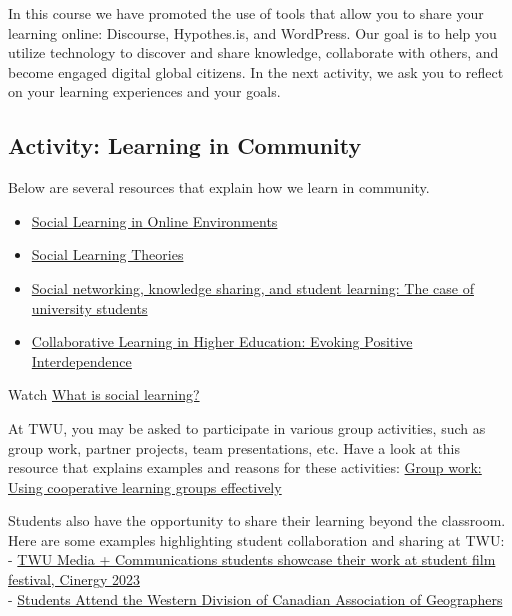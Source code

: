 \documentclass[
]{book}
\providecommand{\tightlist}{%
  \setlength{\itemsep}{0pt}\setlength{\parskip}{0pt}}
\theoremstyle{definition}
\theoremstyle{definition}
\theoremstyle{definition}
\theoremstyle{definition}
\theoremstyle{remark}
\begin{document}
In this course we have promoted the use of tools that allow you to share your learning online: Discourse, Hypothes.is, and WordPress. Our goal is to help you utilize technology to discover and share knowledge, collaborate with others, and become engaged digital global citizens. In the next activity, we ask you to reflect on your learning experiences and your goals.

\hypertarget{activity-learning-in-community}{%
\subsection*{Activity: Learning in Community}\label{activity-learning-in-community}}

\begin{reflect}
Below are several resources that explain how we learn in community.

\begin{itemize}
\tightlist
\item
  \href{https://openpress.usask.ca/humanmooc/chapter/social-learning-in-online-environments/}{Social Learning in Online Environments}
\item
  \href{https://socialsci.libretexts.org/Bookshelves/Education_and_Professional_Development/Teaching_Crowds_-_Learning_and_Social_Media_(Dron_and_Anderson)/02\%3A_Social_Learning_Theories}{Social Learning Theories}
\item
  \href{https://www.sciencedirect.com/science/article/abs/pii/S0360131516300872}{Social networking, knowledge sharing, and student learning: The case of university students}
\item
  \href{https://www.ncbi.nlm.nih.gov/pmc/articles/PMC5132366/}{Collaborative Learning in Higher Education: Evoking Positive Interdependence}
\end{itemize}

Watch \href{https://www.youtube.com/watch?v=AB-_822TRms}{What is social learning?}

At TWU, you may be asked to participate in various group activities, such as group work, partner projects, team presentations, etc. Have a look at this resource that explains examples and reasons for these activities: \href{https://cft.vanderbilt.edu/guides-sub-pages/setting-up-and-facilitating-group-work-using-cooperative-learning-groups-effectively/}{Group work: Using cooperative learning groups effectively}

Students also have the opportunity to share their learning beyond the classroom. Here are some examples highlighting student collaboration and sharing at TWU:\\
- \href{https://www.twu.ca/news-events/news/twu-media-communications-students-showcase-their-work-student-film-festival}{TWU Media + Communications students showcase their work at student film festival, Cinergy 2023}\\
- \href{https://www.twu.ca/research/student-research/news}{Students Attend the Western Division of Canadian Association of Geographers}


\end{reflect}
\end{document}
